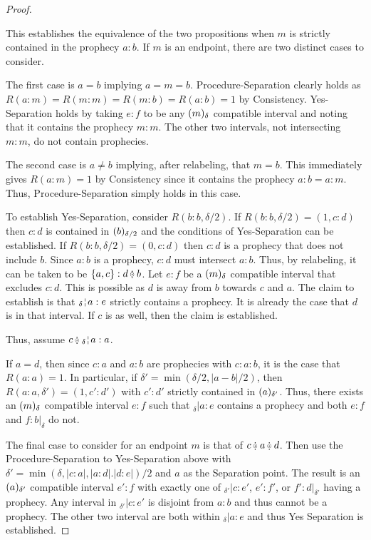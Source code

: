\documentclass[12pt]{article}
\begin{document}
\begin{proof}
\begin{enumerate}
    \end{enumerate} 
    
    This establishes the equivalence of the two propositions when $m$ is strictly contained in the prophecy $a:b$. If $m$ is an endpoint, there are two distinct cases to consider. 

    The first case is $a=b$ implying $a=m=b$. Procedure-Separation clearly holds as $R(a:m)=R(m:m)=R(m:b)=R(a:b) =1$ by Consistency. Yes-Separation holds by taking $e:f$ to be any $\halo{m}$ compatible interval and noting that it contains the prophecy $m:m$. The other two intervals, not intersecting $m:m$, do not contain prophecies. 

    The second case is $a \neq b$ implying, after relabeling, that $m=b$. This immediately gives $R(a:m)=1$ by Consistency since it contains the prophecy $a:b=a:m$. Thus, Procedure-Separation simply holds in this case. 

    To establish Yes-Separation, consider $R(b:b, \delta/2)$. If $R(b:b, \delta/2) = (1, c:d)$ then $c:d$ is contained in $\halo[\delta/2]{b}$ and the conditions of Yes-Separation can be established.  If $R(b:b, \delta/2) = (0,c:d)$ then $c:d$ is a prophecy that does not include $b$. Since $a:b$ is a prophecy, $c:d$ must intersect $a:b$. Thus, by relabeling, it can be taken to be $\{a,c\}:d \betneq b$.  Let $e:f$ be a $\halo{m}$ compatible interval that excludes $c:d$. This is possible as $d$ is away from $b$ towards $c$ and $a$.  The claim to establish is that $\fuzbleft{a} : e$ strictly contains a prophecy. It is already the case that $d$ is in that interval. If $c$ is as well, then the claim is established. 

    Thus, assume $c \betneq \fuzbleft{a} : a$. 
    

    If $a=d$, then since $c:a$ and $a:b$ are prophecies with $c:a:b$, it is the case that $R(a:a)=1$. In particular, if $\delta' = \min(\delta/2, |a-b|/2)$, then $R(a:a, \delta') = (1,c':d')$ with $c':d'$ strictly contained in $\halo[\delta']{a}$. Thus, there exists an $\halo{m}$ compatible interval $e:f$ such that ${}_{\delta}|a:e$ contains a prophecy and both $e:f$ and $f:b|_{\delta}$ do not. 

    The final case to consider for an endpoint $m$ is that of $c \betneq a \betneq d$. Then use the Procedure-Separation to Yes-Separation above with $\delta' = \min(\delta, |c:a|, |a:d|. |d:e|)/2$  and $a$ as the Separation point. The result is an $\halo[\delta']{a}$ compatible interval $e':f$ with exactly one of ${}_{\delta'}|c:e'$, $e':f'$, or $f':d|_{\delta'}$ having a prophecy. Any interval in ${}_{\delta'}|c:e'$ is disjoint from $a:b$ and thus cannot be a prophecy. The other two interval are both within ${}_{\delta}|a:e$ and thus Yes Separation is established.

\end{proof}
\end{document}
